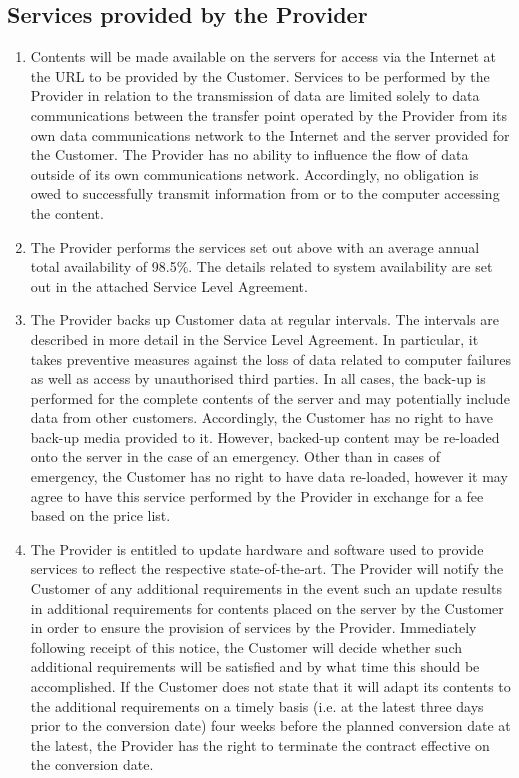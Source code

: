 \documentclass{terms}
\begin{document}
\subsection{Services provided by the Provider}
\begin{enumerate}
\item Contents will be made available on the servers for access via the Internet at the URL to be provided by the Customer. Services to be performed by the Provider in relation to the transmission of data are limited solely to data communications between the transfer point operated by the Provider from its own data communications network to the Internet and the server provided for the Customer. The Provider has no ability to influence the flow of data outside of its own communications network. Accordingly, no obligation is owed to successfully transmit information from or to the computer accessing the content.
\item The Provider performs the services set out above with an average annual total availability of 98.5\%. The details related to system availability are set out in the attached Service Level Agreement. 
\item The Provider backs up Customer data at regular intervals. The intervals are described in more detail in the Service Level Agreement. In particular, it takes preventive measures against the loss of data related to computer failures as well as access by unauthorised third parties. In all cases, the back-up is performed for the complete contents of the server and may potentially include data from other customers. Accordingly, the Customer has no right to have back-up media provided to it. However, backed-up content may be re-loaded onto the server in the case of an emergency. Other than in cases of emergency, the Customer has no right to have data re-loaded, however it may agree to have this service performed by the Provider in exchange for a fee based on the price list.
\item The Provider is entitled to update hardware and software used to provide services to reflect the respective state-of-the-art. The Provider will notify the Customer of any additional requirements in the event such an update results in additional requirements for contents placed on the server by the Customer in order to ensure the provision of services by the Provider. Immediately following receipt of this notice, the Customer will decide whether such additional requirements will be satisfied and by what time this should be accomplished. If the Customer does not state that it will adapt its contents to the additional requirements on a timely basis (i.e. at the latest three days prior to the conversion date) four weeks before the planned conversion date at the latest, the Provider has the right to terminate the contract effective on the conversion date.

\end{enumerate}
\end{document}
